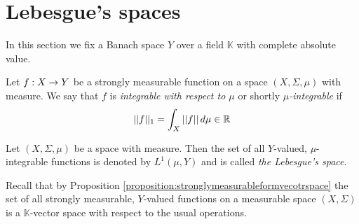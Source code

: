 \section{Lebesgue's spaces}\label{section:lebesguespaces}
\noindent
In this section we fix a Banach space $Y$ over a field $\mathbb{K}$ with complete absolute value.

\begin{definition}
Let $f:X\rightarrow Y$ be a strongly measurable function on a space $(X,\Sigma,\mu)$ with measure. We say that $f$ is \textit{integrable with respect to $\mu$} or shortly \textit{$\mu$-integrable} if
$$||f||_1 = \int_X||f||\,d\mu \in {\mathbb R}$$
\end{definition}

\begin{definition}
Let $(X,\Sigma,\mu)$ be a space with measure. Then the set of all $Y$-valued, $\mu$-integrable functions is denoted by $L^1(\mu,Y)$ and is called \textit{the Lebesgue's space}.
\end{definition}
\noindent
Recall that by Proposition \ref{proposition:stronglymeasurableformvecotrspace} the set of all strongly measurable, $Y$-valued functions on a measurable space $(X,\Sigma)$ is a $\mathbb{K}$-vector space with respect to the usual operations.

